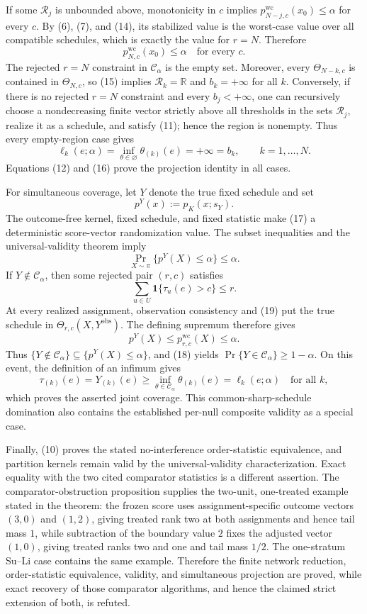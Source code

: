 If some \(\mathcal R_j\) is unbounded above, monotonicity in \(c\) implies \(p^{\mathrm{wc}}_{N-j,c}(x_0)\leq\alpha\) for every \(c\).  By (6), (7), and (14), its stabilized value is the worst-case value over all compatible schedules, which is exactly the value for \(r=N\).  Therefore
\[
p^{\mathrm{wc}}_{N,c}(x_0)\leq\alpha
\quad\text{for every }c.
\tag{15}
\]
The rejected \(r=N\) constraint in \(\mathcal C_\alpha\) is the empty set.  Moreover, every \(\Theta_{N-k,c}\) is contained in \(\Theta_{N,c}\), so (15) implies \(\mathcal R_k=\mathbb R\) and \(b_k=+\infty\) for all \(k\).  Conversely, if there is no rejected \(r=N\) constraint and every \(b_j<+\infty\), one can recursively choose a nondecreasing finite vector strictly above all thresholds in the sets \(\mathcal R_j\), realize it as a schedule, and satisfy (11); hence the region is nonempty.  Thus every empty-region case gives
\[
\ell_k(e;\alpha)=\inf_{\theta\in\varnothing}\theta_{(k)}(e)
=+\infty=b_k,
\qquad k=1,\ldots,N.
\tag{16}
\]
Equations (12) and (16) prove the projection identity in all cases.

For simultaneous coverage, let \(Y\) denote the true fixed schedule and set
\[
p^Y(x):=p_K(x;s_Y).
\tag{17}
\]
The outcome-free kernel, fixed schedule, and fixed statistic make (17) a deterministic score-vector randomization value.  The subset inequalities and the universal-validity theorem imply
\[
\Pr_{X\sim\pi}\{p^Y(X)\leq\alpha\}\leq\alpha.
\tag{18}
\]
If \(Y\notin\mathcal C_\alpha\), then some rejected pair \((r,c)\) satisfies
\[
\sum_{u\in U}\mathbf 1\{\tau_u(e)>c\}\leq r.
\tag{19}
\]
At every realized assignment, observation consistency and (19) put the true schedule in \(\Theta_{r,c}(X,Y^{\mathrm{obs}})\).  The defining supremum therefore gives
\[
p^Y(X)\leq p^{\mathrm{wc}}_{r,c}(X)\leq\alpha.
\tag{20}
\]
Thus \(\{Y\notin\mathcal C_\alpha\}\subseteq\{p^Y(X)\leq\alpha\}\), and (18) yields \(\Pr\{Y\in\mathcal C_\alpha\}\geq1-\alpha\).  On this event, the definition of an infimum gives
\[
\tau_{(k)}(e)=Y_{(k)}(e)
\geq\inf_{\theta\in\mathcal C_\alpha}\theta_{(k)}(e)
=\ell_k(e;\alpha)
\quad\text{for all }k,
\tag{21}
\]
which proves the asserted joint coverage.  This common-sharp-schedule domination also contains the established per-null composite validity as a special case.

Finally, (10) proves the stated no-interference order-statistic equivalence, and partition kernels remain valid by the universal-validity characterization.  Exact equality with the two cited comparator statistics is a different assertion.  The comparator-obstruction proposition supplies the two-unit, one-treated example stated in the theorem: the frozen score uses assignment-specific outcome vectors \((3,0)\) and \((1,2)\), giving treated rank two at both assignments and hence tail mass \(1\), while subtraction of the boundary value \(2\) fixes the adjusted vector \((1,0)\), giving treated ranks two and one and tail mass \(1/2\).  The one-stratum Su--Li case contains the same example.  Therefore the finite network reduction, order-statistic equivalence, validity, and simultaneous projection are proved, while exact recovery of those comparator algorithms, and hence the claimed strict extension of both, is refuted.
